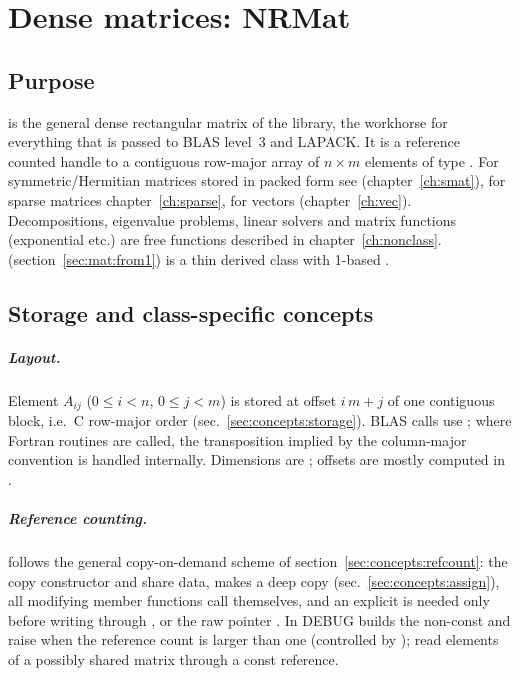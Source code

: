 \chapter{Dense matrices: NRMat}\label{ch:mat}

\section{Purpose}\label{sec:mat:purpose}
 is the general dense rectangular matrix of the \LA{} library, the
workhorse for everything that is passed to BLAS level~3 and LAPACK. It is a reference counted
handle to a contiguous row-major array of $n\times m$ elements of type .
For symmetric/Hermitian matrices stored in packed form see  (chapter~\ref{ch:smat}),
for sparse matrices chapter~\ref{ch:sparse}, for vectors  (chapter~\ref{ch:vec}).
Decompositions, eigenvalue problems, linear solvers and matrix functions (exponential etc.) are
free functions described in chapter~\ref{ch:nonclass}.
 (section~\ref{sec:mat:from1}) is a thin derived class with 1-based
.

\section{Storage and class-specific concepts}\label{sec:mat:storage}

\paragraph{Layout.} Element $A_{ij}$ ($0\le i<n$, $0\le j<m$) is stored at offset $i\,m+j$ of one
contiguous block, i.e.\ C row-major order (sec.~\ref{sec:concepts:storage}). BLAS calls use
; where Fortran routines are called, the transposition implied by the
column-major convention is handled internally. Dimensions are ; offsets are mostly
computed in .

\paragraph{Reference counting.}  follows the general copy-on-demand scheme of
section~\ref{sec:concepts:refcount}: the copy constructor and  share data,
\code{|=} makes a deep copy (sec.~\ref{sec:concepts:assign}), all modifying member functions
call  themselves, and an explicit  is needed only before writing
through ,  or the raw pointer .
In DEBUG builds the non-const  and  raise  when the
reference count is larger than one (controlled by ); read elements of a
possibly shared matrix through a const reference.

